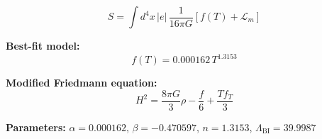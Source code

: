 
\begin{equation}
  S = \int d^4x \, |e| \, \frac{1}{16\pi G} \left[ f(T) + \mathcal{L}_m \right]
\end{equation}

\textbf{Best-fit model:}
\begin{equation}
  f(T) = 0.000162 \, T^{1.3153}
\end{equation}

\textbf{Modified Friedmann equation:}
\begin{equation}
  H^2 = \frac{8\pi G}{3} \rho - \frac{f}{6} + \frac{T f_T}{3}
\end{equation}

\textbf{Parameters:}
$\alpha = 0.000162$, \quad
$\beta = -0.470597$, \quad
$n = 1.3153$, \quad
$\Lambda_{\text{BI}} = 39.9987$